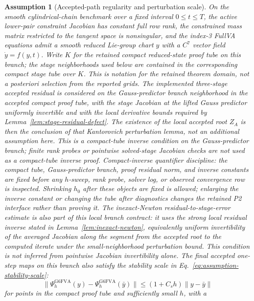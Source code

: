 \documentclass[preprint,12pt]{elsarticle}
\newtheorem{assumption}{Assumption}
\begin{document}
\begin{assumption}[Accepted-path regularity and perturbation scale]
\label{ass:regularity}
On the smooth cylindrical-chain benchmark over a fixed interval
$0\le t\le T$, the active lower-pair constraint Jacobian has constant full row
rank, the constrained mass matrix restricted to the tangent space is
nonsingular, and the index-3 FullVA equations admit a smooth reduced
Lie-group chart $y$ with a $C^7$ vector field $\dot y=f(y,t)$.  Write
\(K\) for the retained compact reduced-state proof tube on this branch; the
stage neighborhoods used below are contained in the corresponding compact
stage tube over \(K\).  This is notation for the retained theorem domain, not
a posteriori selection from the reported grids. The
implemented three-stage accepted residual is considered on the
Gauss-predictor branch neighborhood in the accepted compact proof tube, with
the stage Jacobian at the lifted Gauss predictor uniformly invertible and
with the local derivative bounds required by
Lemma~\ref{lem:stage-residual-defect}. The existence of the local accepted
root \(Z_A\) is then the conclusion of that Kantorovich perturbation lemma,
not an additional assumption here. This is a compact-tube inverse condition
on the Gauss-predictor branch; finite rank probes or pointwise solved-stage
Jacobian checks are not used as a compact-tube inverse proof.
Compact-inverse quantifier discipline: the compact tube, Gauss-predictor branch,
proof residual norm, and inverse constants are fixed before any \(h\)-sweep,
rank probe, solver log, or observed convergence row is inspected. Shrinking
\(h_0\) after these objects are fixed is allowed; enlarging the inverse
constant or changing the tube after diagnostics changes the retained P2
interface rather than proving it.
The inexact-Newton
residual-to-stage-error estimate is also part of this local branch contract:
it uses the strong local residual inverse stated in
Lemma~\ref{lem:inexact-newton}, equivalently uniform invertibility of the
averaged Jacobian along the segment from the accepted root to the computed
iterate under the small-neighborhood perturbation bound. This condition is
not inferred from pointwise Jacobian invertibility alone. The final accepted
one-step maps on this branch also satisfy the stability scale in
Eq.~\eqref{eq:assumption-stability-scale}:
\begin{equation}
\label{eq:assumption-stability-scale}
  \|\Psi_h^{\mathrm{G6FVA}}(y)-\Psi_h^{\mathrm{G6FVA}}(\bar y)\|
  \le (1+C_s h)\|y-\bar y\|
\end{equation}
for points in the compact proof tube and sufficiently small \(h\), with a

\end{assumption}
\end{document}
